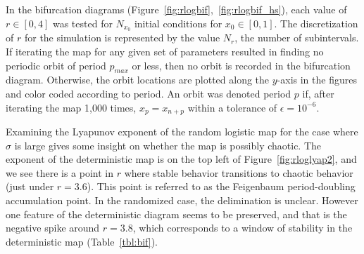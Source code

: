 In the bifurcation diagrams
(Figure~\ref{fig:rlogbif},~\ref{fig:rlogbif_hs}), each value of $r \in
[0,4]$ was tested for $N_{x_0}$ initial conditions for $x_0 \in [0,1]$. The discretization
of $r$ for the simulation is represented by the value $N_r$, the
number of subintervals. If iterating the map for any given set of
parameters resulted in finding no periodic orbit of period $p_{max}$
or less, then no orbit is recorded in the bifurcation
diagram. Otherwise, the orbit locations are plotted along the $y$-axis
in the figures and color coded according to period. An orbit was
denoted period $p$ if, after iterating the map 1,000 times,
$x_p=x_{n+p}$ within a tolerance of $\epsilon = 10^{-6}$.

Examining the Lyapunov exponent of the random logistic
map for the case where $\sigma$ is large gives some insight on whether
the map is possibly chaotic. The exponent of the deterministic map is
on the top left of Figure~\ref{fig:rloglyap2}, and we see there is a
point in $r$ where stable behavior transitions to chaotic behavior
(just under $r=3.6$). This point is referred to as the Feigenbaum
period-doubling accumulation point. In the randomized case, the
delimination is unclear. However one feature of the deterministic
diagram seems to be preserved, and that is the negative spike around
$r=3.8$, which corresponds to a window of stability in the
deterministic map (Table~\ref{tbl:bif}).

